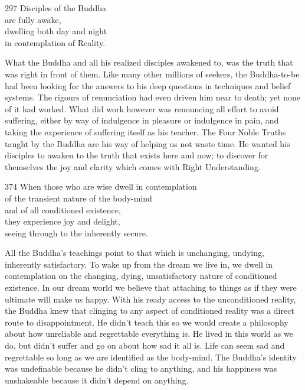 
\begin{dhpVerse}{297}
\label{dhp-297}
Disciples of the Buddha\\
are fully awake,\\
dwelling both day and night\\
in contemplation of Reality.
\end{dhpVerse}

\begin{dhpRefl}
  What the Buddha and all his realized disciples awakened to, was the truth
  that was right in front of them. Like many other millions of seekers, the
  Buddha-to-be had been looking for the answers to his deep questions in
  techniques and belief systems. The rigours of renunciation had even driven
  him near to death; yet none of it had worked. What did work however was
  renouncing all effort to avoid suffering, either by way of indulgence in
  pleasure or indulgence in pain, and taking the experience of suffering
  itself as his teacher. The Four Noble Truths taught by the Buddha are his
  way of helping us not waste time. He wanted his disciples to awaken to the
  truth that exists here and now; to discover for themselves the joy and
  clarity which comes with Right Understanding.
\end{dhpRefl}


\begin{dhpVerse}{374}
\label{dhp-374}
When those who are wise dwell in contemplation\\
of the transient nature of the body-mind\\
and of all conditioned existence,\\
they experience joy and delight,\\
seeing through to the inherently secure.
\end{dhpVerse}

\begin{dhpRefl}
  All the Buddha's teachings point to that which is unchanging, undying,
  inherently satisfactory. To wake up from the dream we live in, we dwell in
  contemplation on the changing, dying, unsatisfactory nature of conditioned
  existence. In our dream world we believe that attaching to things as if they
  were ultimate will make us happy. With his ready access to the unconditioned
  reality, the Buddha knew that clinging to any aspect of conditioned reality
  was a direct route to disappointment. He didn't teach this so we would create
  a philosophy about how unreliable and regrettable everything is. He lived in
  this world as we do, but didn't suffer and go on about how sad it all is. Life
  can seem sad and regrettable so long as we are identified as the body-mind.
  The Buddha's identity was undefinable because he didn't cling to anything, and
  his happiness was unshakeable because it didn't depend on anything.
\end{dhpRefl}

